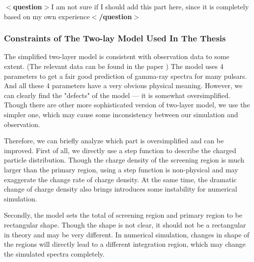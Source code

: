 \documentclass[12pt]{report}
\newcommand{\question}[1]{
  $<$\textbf{question}$>$#1$<$\textbf{/question}$>$
}
\begin{document}
          \question{I am not sure if I should add this part here, since it is completely based on 
            my own experience}
          \subsubsection{Constraints of The Two-lay Model Used In The Thesis} 
            The simplified two-layer model is consistent with observation data to some extent. 
            (The relevant data can be found in the paper 
            \href{http://iopscience.iop.org/article/10.1088/0004-637X/720/1/178/pdf}
            {})
            The model uses 4 parameters to get a fair good prediction of gamma-ray spectra for many 
            pulsars. And all these 4 parameters have a very obvious physical meaning. 
            However, we can clearly find the "defects" of the model --- it is somewhat oversimplified. 
            Though there are other more sophisticated version of two-layer model, we use the simpler one, 
            which may cause some inconsistency between our simulation and observation. 

            Therefore, we can briefly analyze which part is oversimplified and can be improved. 
            First of all, we directly use a step function to describe the charged particle distribution. 
            Though the charge density of the screening region is much larger than the primary region, using 
            a step function is non-physical and may exaggerate the change rate of charge density. At the 
            same time, the dramatic change of charge density also brings introduces some instability for 
            numerical simulation. 

            Secondly, the model sets the total of screening region and primary region to be rectangular shape. 
            Though the shape is not clear, it should not be a rectangular in theory and may be very different.
            In numerical simulation, changes in shape of the regions will directly lead to a different 
            integration region, which may change the simulated spectra completely. 
\end{document}
